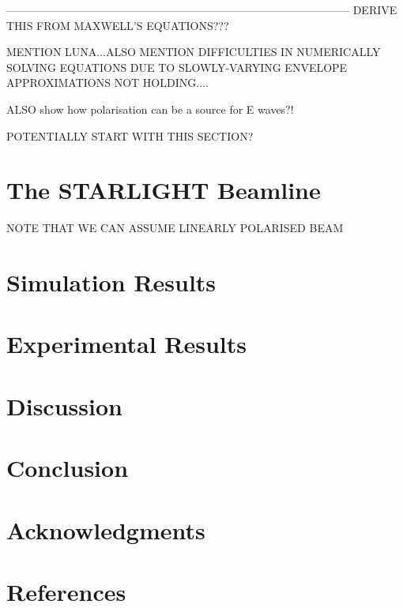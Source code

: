 \documentclass[a4paper]{jpconf}
\begin{document}
---------------------------------------------------------------------------------------------
DERIVE THIS FROM MAXWELL'S EQUATIONS???



MENTION LUNA...ALSO MENTION DIFFICULTIES IN NUMERICALLY SOLVING EQUATIONS DUE TO SLOWLY-VARYING ENVELOPE APPROXIMATIONS NOT HOLDING....

ALSO show how polarisation can be a source for E waves?!

POTENTIALLY START WITH THIS SECTION?

\section{The STARLIGHT Beamline}

NOTE THAT WE CAN ASSUME LINEARLY POLARISED BEAM

\section{Simulation Results}

\section{Experimental Results}

\section{Discussion}

\section{Conclusion}

\section*{Acknowledgments}

\section*{References}


\end{document}
